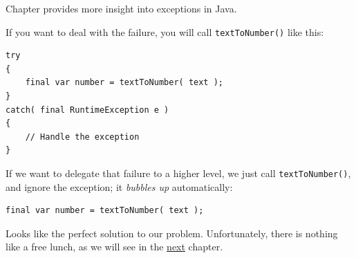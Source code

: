 Chapter  provides more insight into exceptions in Java. 

If you want to deal with the failure, you will call \lstinline|textToNumber()| like this:
\begin{lstlisting}
try
{
    final var number = textToNumber( text );
}
catch( final RuntimeException e )
{
    // Handle the exception
}
\end{lstlisting}

If we want to delegate that failure to a higher level, we just call \lstinline|textToNumber()|, and ignore the exception; it \textit{bubbles up} automatically:
\begin{lstlisting}
final var number = textToNumber( text );
\end{lstlisting}

Looks like the perfect solution to our problem. Unfortunately, there is nothing like a free lunch, as we will see in the \hyperref[sec:ExceptionCosts]{next} chapter.

